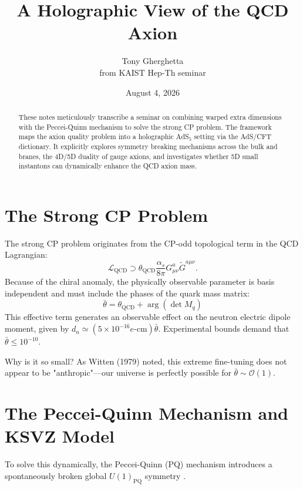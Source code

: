 \documentclass[11pt]{article}
\title{A Holographic View of the QCD Axion}
\author{Tony Gherghetta \\ from KAIST Hep-Th seminar}
\date{August 4, 2026}
\begin{document}
\maketitle

\begin{abstract}
These notes meticulously transcribe a seminar on combining warped extra dimensions with the Peccei-Quinn mechanism to solve the strong CP problem. The framework maps the axion quality problem into a holographic AdS$_5$ setting via the AdS/CFT dictionary. It explicitly explores symmetry breaking mechanisms across the bulk and branes, the 4D/5D duality of gauge axions, and investigates whether 5D small instantons can dynamically enhance the QCD axion mass.
\end{abstract}

\section{The Strong CP Problem}
The strong CP problem originates from the CP-odd topological term in the QCD Lagrangian:
\begin{equation}
    \mathcal{L}_{\text{QCD}} \supset \theta_{\text{QCD}} \frac{\alpha_s}{8\pi} G_{\mu\nu}^a \tilde{G}^{a\mu\nu}.
\end{equation}
Because of the chiral anomaly, the physically observable parameter is basis independent and must include the phases of the quark mass matrix:
\begin{equation}
    \bar{\theta} = \theta_{\text{QCD}} + \arg(\det M_q)
\end{equation}
This effective term generates an observable effect on the neutron electric dipole moment, given by $d_n \simeq (5 \times 10^{-16} e\text{-cm}) \bar{\theta}$. Experimental bounds demand that $\bar{\theta} \le 10^{-10}$. 

Why is it so small? As Witten (1979) \cite{witten1979} noted, this extreme fine-tuning does not appear to be "anthropic"—our universe is perfectly possible for $\bar{\theta} \sim \mathcal{O}(1)$. 

\section{The Peccei-Quinn Mechanism and KSVZ Model}
To solve this dynamically, the Peccei-Quinn (PQ) mechanism introduces a spontaneously broken global $U(1)_{\text{PQ}}$ symmetry \cite{pecceiquinn1977, weinberg1978, wilczek1978}. 
\end{document}
